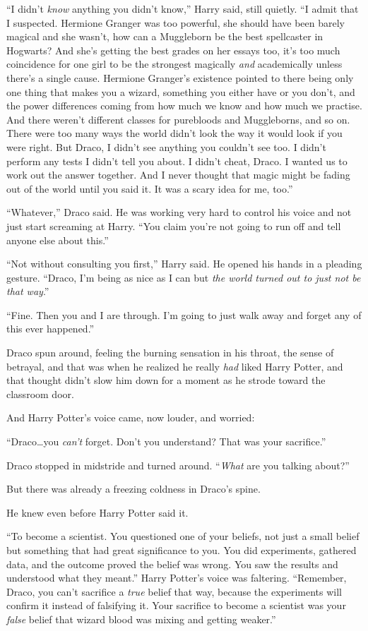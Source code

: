 “I didn’t \emph{know} anything you didn’t know,” Harry said, still quietly. “I
admit that I suspected. Hermione Granger was too powerful, she should have been
barely magical and she wasn’t, how can a Muggleborn be the best spellcaster in
Hogwarts? And she’s getting the best grades on her essays too, it’s too much
coincidence for one girl to be the strongest magically \emph{and} academically
unless there’s a single cause. Hermione Granger’s existence pointed to there
being only one thing that makes you a wizard, something you either have or you
don’t, and the power differences coming from how much we know and how much we
practise. And there weren’t different classes for purebloods and Muggleborns,
and so on. There were too many ways the world didn’t look the way it would look
if you were right. But Draco, I didn’t see anything you couldn’t see too. I
didn’t perform any tests I didn’t tell you about. I didn’t cheat, Draco. I
wanted us to work out the answer together. And I never thought that magic might
be fading out of the world until you said it. It was a scary idea for me, too.”

“Whatever,” Draco said. He was working very hard to control his voice and not
just start screaming at Harry. “You claim you’re not going to run off and tell
anyone else about this.”

“Not without consulting you first,” Harry said. He opened his hands in a
pleading gesture. “Draco, I’m being as nice as I can but \emph{the world turned
out to just not be that way}.”

“Fine. Then you and I are through. I’m going to just walk away and forget any
of this ever happened.”

Draco spun around, feeling the burning sensation in his throat, the sense of
betrayal, and that was when he realized he really \emph{had} liked Harry
Potter, and that thought didn’t slow him down for a moment as he strode toward
the classroom door.

And Harry Potter’s voice came, now louder, and worried:

“Draco…you \emph{can’t} forget. Don’t you understand? That was your
sacrifice.”

Draco stopped in midstride and turned around. “\emph{What} are you talking
about?”

But there was already a freezing coldness in Draco’s spine.

He knew even before Harry Potter said it.

“To become a scientist. You questioned one of your beliefs, not just a small
belief but something that had great significance to you. You did experiments,
gathered data, and the outcome proved the belief was wrong. You saw the results
and understood what they meant.” Harry Potter’s voice was faltering. “Remember,
Draco, you can’t sacrifice a \emph{true} belief that way, because the
experiments will confirm it instead of falsifying it. Your sacrifice to become
a scientist was your \emph{false} belief that wizard blood was mixing and
getting weaker.”


